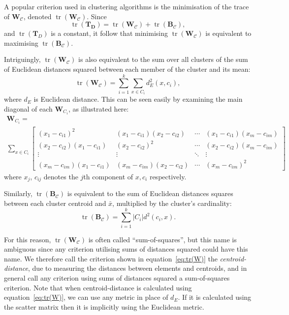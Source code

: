 \documentclass[a4paper]{report}
\DeclareMathOperator*{\tr}{tr}
\newcommand{\dset}{D}
\newcommand{\clus}{\mathcal{C}}
\begin{document}
A popular criterion used in clustering algorithms is the minimisation of the
trace of $\mathbf{W_{\clus}}$, denoted $\tr(\mathbf{W_{\clus}})$.  Since
\begin{equation*}
  \tr(\mathbf{T_{\dset}}) = \tr(\mathbf{W_{\clus}}) + \tr(\mathbf{B_{\clus}}),
\end{equation*}
and $\tr(\mathbf{T}_{\dset})$ is a constant, it follow that minimising
$\tr(\mathbf{W_{\clus}})$ is equivalent to maximising
$\tr(\mathbf{B_{\clus}})$.

Intriguingly, $\tr(\mathbf{W}_{\clus})$ is also equivalent to the sum over all
clusters of the sum of Euclidean distances squared between each member of the
cluster and its mean:
\begin{equation}
  \label{eq:tr(W)}
  \tr(\mathbf{W_{\clus}}) = \sum_{i=1}^{k} \sum_{x \in C_i} d_{E}^2(x,c_i),
\end{equation}
where $d_{E}$ is Euclidean distance.  This can be seen easily by examining the
main diagonal of each $\mathbf{W}_{C_i}$, as illustrated here:
\begin{multline*}
  \mathbf{W}_{C_i} = \\
  \sum_{x \in C_i}
  \begin{bmatrix}
    (x_1-c_{i1})^2 & (x_1-c_{i1})(x_2-c_{i2}) & \cdots &
    (x_1-c_{i1})(x_m-c_{im}) \\
    (x_2-c_{i2})(x_1-c_{i1}) & (x_2-c_{i2})^2 & \cdots &
    (x_2-c_{i2})(x_m-c_{im}) \\
    \vdots & \vdots & \ddots & \vdots \\
    (x_m-c_{im})(x_1-c_{i1}) & (x_m-c_{im})(x_2-c_{i2}) & \cdots &
    (x_m-c_{im})^2
  \end{bmatrix}
\end{multline*}
where $x_j$, $c_{ij}$ denotes the $j$th component of $x,c_{i}$ respectively.

Similarly, $\tr(\mathbf{B_{\clus}})$ is equivalent to the sum of Euclidean
distances squares between each cluster centroid and $\bar{x}$, multiplied by
the cluster's cardinality:
\begin{equation}
  \label{eq:tr(B)}
  \tr(\mathbf{B_{\clus}}) = \sum_{i=1}^{k} |C_i| d^2(c_i,x).
\end{equation}

For this reason, $\tr(\mathbf{W}_{\clus})$ is often called ``sum-of-squares'',
but this name is ambiguous since any criterion utilising sums of distances
squared could have this name.  We therefore call the criterion shown in
equation~\eqref{eq:tr(W)} the \textit{centroid-distance}, due to measuring the
distances between elements and centroids, and in general call any criterion
using sums of distances squared a sum-of-squares criterion.  Note that when
centroid-distance is calculated using equation~\eqref{eq:tr(W)}, we can use
any metric in place of $d_{E}$.  If it is calculated using the scatter matrix
then it is implicitly using the Euclidean metric.
\end{document}
